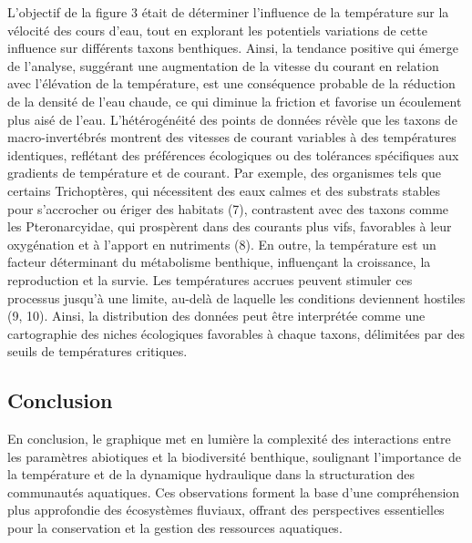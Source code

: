 \documentclass[9pt,twocolumn,twoside,]{pnas-new}
\begin{document}
L'objectif de la figure 3 était de déterminer l'influence de la
température sur la vélocité des cours d'eau, tout en explorant les
potentiels variations de cette influence sur différents taxons
benthiques. Ainsi, la tendance positive qui émerge de l'analyse,
suggérant une augmentation de la vitesse du courant en relation avec
l'élévation de la température, est une conséquence probable de la
réduction de la densité de l'eau chaude, ce qui diminue la friction et
favorise un écoulement plus aisé de l'eau. L'hétérogénéité des points de
données révèle que les taxons de macro-invertébrés montrent des vitesses
de courant variables à des températures identiques, reflétant des
préférences écologiques ou des tolérances spécifiques aux gradients de
température et de courant. Par exemple, des organismes tels que certains
Trichoptères, qui nécessitent des eaux calmes et des substrats stables
pour s'accrocher ou ériger des habitats (7), contrastent avec des taxons
comme les Pteronarcyidae, qui prospèrent dans des courants plus vifs,
favorables à leur oxygénation et à l'apport en nutriments (8). En outre,
la température est un facteur déterminant du métabolisme benthique,
influençant la croissance, la reproduction et la survie. Les
températures accrues peuvent stimuler ces processus jusqu'à une limite,
au-delà de laquelle les conditions deviennent hostiles (9, 10). Ainsi,
la distribution des données peut être interprétée comme une cartographie
des niches écologiques favorables à chaque taxons, délimitées par des
seuils de températures critiques.

\hypertarget{Conclusion}{%
\subsection*{Conclusion}\label{Conclusion}}

En conclusion, le graphique met en lumière la complexité des
interactions entre les paramètres abiotiques et la biodiversité
benthique, soulignant l'importance de la température et de la dynamique
hydraulique dans la structuration des communautés aquatiques. Ces
observations forment la base d'une compréhension plus approfondie des
écosystèmes fluviaux, offrant des perspectives essentielles pour la
conservation et la gestion des ressources aquatiques.

\showmatmethods
\showacknow
\pnasbreak
\end{document}

